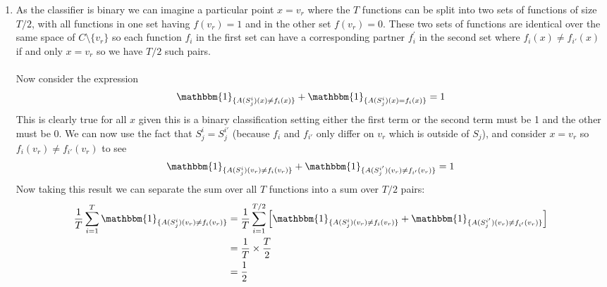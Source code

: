 \documentclass{article}
\newcommand{\one}{\mathbbm{1}}
\newcommand{\ones}[2]{\one_{\{#1\ne#2\}}}
\begin{document}
\begin{enumerate}
\begin{enumerate}[label=\alph*.]
    \item As the classifier is binary we can imagine a particular point $x=v_r$ where the $T$ functions can be split into two sets of functions of size $T/2$, with all functions in one set having $f(v_r)=1$ and in the other set $f(v_r)=0$. These two sets of functions are identical over the same space of $C\setminus\{v_r\}$ so each function $f_i$ in the first set can have a corresponding partner $f_i^'$ in the second set where $f_i(x)\ne f_{i'}(x)$ if and only $x=v_r$ so we have $T/2$ such pairs.
    \\\\
    Now consider the expression
    \begin{equation*}
        \ones{A(S_j^i)(x)}{f_i(x)} + \one_{\{A(S_j^i)(x)=f_{i}(x)\}}= 1
    \end{equation*}
    This is clearly true for all $x$ given this is a binary classification setting either the first term or the second term must be 1 and the other must be 0. We can now use the fact that $S_j^i = S_j^{i'}$ (because $f_i$ and $f_{i'}$ only differ on $v_r$ which is outside of $S_j$), and consider $x=v_r$ so $f_i(v_r)\ne f_{i'}(v_r)$ to see
    \begin{equation}
        \ones{A(S_j^i)(v_r)}{f_i(v_r)} + \ones{A(S_j^{i'})(v_r)}{f_{i'}(v_r)}{} = 1
        \label{eqn:d_ones}
    \end{equation}
    Now taking this result we can separate the sum over all $T$ functions into a sum over $T/2$ pairs:
    \begin{align}
        \frac{1}{T}\sum\limits_{i=1}^{T}\ones{A(S_j^i)(v_r)}{f_i(v_r)} &= \frac{1}{T}\sum\limits_{i=1}^{T/2}\left[\ones{A(S_j^i)(v_r)}{f_i(v_r)} + \ones{A(S_j^{i'})(v_r)}{f_{i'}(v_r)}{}\right] \nonumber \\
        &=\frac{1}{T}\times \frac{T}{2} \nonumber \\
        &=\frac{1}{2} \label{eqn:d}
    \end{align}


\end{enumerate}
\end{enumerate}
\end{document}
